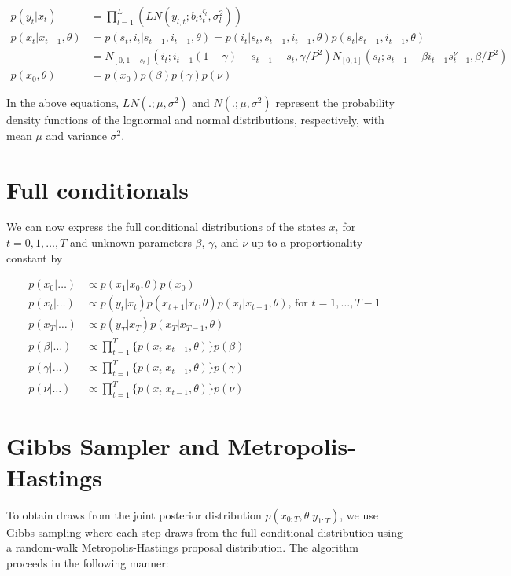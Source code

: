 \documentclass{article}
\begin{document}
\begin{align*}
p(y_t|x_t) &= \prod_{l=1}^L \left(LN(y_{l,t};b_li_t^{\varsigma_l},\sigma_l^2)\right) \\
p(x_t|x_{t-1},\theta) &= p(s_t,i_t|s_{t-1},i_{t-1},\theta) = p(i_t|s_t,s_{t-1},i_{t-1},\theta)p(s_t|s_{t-1},i_{t-1},\theta) \\
&= N_{[0,1-s_t]}(i_t;i_{t-1}(1 - \gamma) + s_{t-1} - s_t, \gamma / P^2)N_{[0,1]}(s_t; s_{t-1} - \beta i_{t-1}s^{\nu}_{t-1}, \beta / P^2) \\
p(x_0,\theta) &= p(x_0)p(\beta)p(\gamma)p(\nu)
\end{align*}

\noindent In the above equations, $LN(.;\mu,\sigma^2)$ and $N(.;\mu,\sigma^2)$ represent the probability density functions of the lognormal and normal distributions, respectively, with mean $\mu$ and variance $\sigma^2$.

\section{Full conditionals} \label{sec:fullcond}
We can now express the full conditional distributions of the states $x_t$ for $t = 0, 1, \ldots, T$ and unknown parameters $\beta$, $\gamma$, and $\nu$ up to a proportionality constant by

\begin{align*}
p(x_0|\hdots) &\propto p(x_1|x_0,\theta)p(x_0) \\
p(x_t|\hdots) &\propto p(y_t|x_t)p(x_{t+1}|x_t,\theta)p(x_t|x_{t-1},\theta) \mbox{, for } t = 1,\ldots,T-1 \\
p(x_T|\hdots) &\propto p(y_T|x_T)p(x_T|x_{T-1},\theta) \\
p(\beta|\hdots) &\propto \prod_{t=1}^T \{p(x_t|x_{t-1},\theta)\}p(\beta) \\
p(\gamma|\hdots) &\propto \prod_{t=1}^T \{p(x_t|x_{t-1},\theta)\}p(\gamma) \\
p(\nu|\hdots) &\propto \prod_{t=1}^T \{p(x_t|x_{t-1},\theta)\}p(\nu)
\end{align*}

\section{Gibbs Sampler and Metropolis-Hastings} \label{sec:gibbs}

To obtain draws from the joint posterior distribution $p(x_{0:T},\theta|y_{1:T})$, we use Gibbs sampling where each step draws from the full conditional distribution using a random-walk Metropolis-Hastings proposal distribution. The algorithm proceeds in the following manner:
\end{document}
